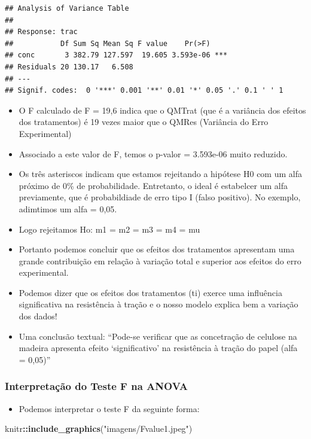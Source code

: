 \documentclass[
]{book}
\newenvironment{Shaded}{\begin{snugshade}}{\end{snugshade}}
\newcommand{\FunctionTok}[1]{\textcolor[rgb]{0.13,0.29,0.53}{\textbf{#1}}}
\newcommand{\NormalTok}[1]{#1}
\newcommand{\SpecialCharTok}[1]{\textcolor[rgb]{0.81,0.36,0.00}{\textbf{#1}}}
\newcommand{\StringTok}[1]{\textcolor[rgb]{0.31,0.60,0.02}{#1}}
\providecommand{\tightlist}{%
  \setlength{\itemsep}{0pt}\setlength{\parskip}{0pt}}
\begin{document}
\begin{verbatim}
## Analysis of Variance Table
## 
## Response: trac
##           Df Sum Sq Mean Sq F value    Pr(>F)    
## conc       3 382.79 127.597  19.605 3.593e-06 ***
## Residuals 20 130.17   6.508                      
## ---
## Signif. codes:  0 '***' 0.001 '**' 0.01 '*' 0.05 '.' 0.1 ' ' 1
\end{verbatim}

\begin{itemize}
\item
  O F calculado de F = 19,6 indica que o QMTrat (que é a variância dos efeitos dos tratamentos) é 19 vezes maior que o QMRes (Variância do Erro Experimental)
\item
  Associado a este valor de F, temos o p-valor = 3.593e-06 muito reduzido.
\item
  Os três asteriscos indicam que estamos rejeitando a hipótese H0 com um alfa próximo de 0\% de probabilidade. Entretanto, o ideal é estabelcer um alfa previamente, que é probabildiade de erro tipo I (falso positivo). No exemplo, adimtimos um alfa = 0,05.
\item
  Logo rejeitamos Ho: m1 = m2 = m3 = m4 = mu
\item
  Portanto podemos concluir que os efeitos dos tratamentos apresentam uma grande contribuição em relação à variação total e superior aos efeitos do erro experimental.
\item
  Podemos dizer que os efeitos dos tratamentos (ti) exerce uma influência significativa na resistência à tração e o nosso modelo explica bem a variação dos dados!
\item
  Uma conclusão textual: ``Pode-se verificar que as concetração de celulose na madeira apresenta efeito `significativo' na resistência à tração do papel (alfa = 0,05)''
\end{itemize}

\subsubsection{Interpretação do Teste F na ANOVA}\label{interpretauxe7uxe3o-do-teste-f-na-anova}

\begin{itemize}
\tightlist
\item
  Podemos interpretar o teste F da seguinte forma:
\end{itemize}

\begin{Shaded}
\begin{Highlighting}[]
\NormalTok{knitr}\SpecialCharTok{::}\FunctionTok{include\_graphics}\NormalTok{(}\StringTok{"imagens/Fvalue1.jpeg"}\NormalTok{)}
\end{Highlighting}
\end{Shaded}
\end{document}
